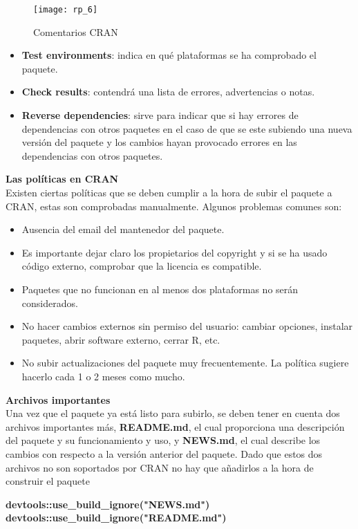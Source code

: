 \begin{figure}[H]
    \centering
    \texttt{[image: rp\_6]}
    \caption{Comentarios CRAN}
    \label{fig:comentarios}
\end{figure} 
\begin{itemize}

    \item \textbf{Test environments}: indica en qu\'e plataformas se ha comprobado el paquete.
    \item \textbf{Check results}: contendr\'a una lista de errores, advertencias o notas.
    \item \textbf{Reverse dependencies}: sirve para indicar que si hay errores de dependencias con
otros paquetes en el caso de que se este  subiendo una nueva versi\'on del paquete y los cambios hayan provocado errores en las dependencias con otros paquetes.
\end{itemize}

\textbf{Las pol\'iticas en CRAN}\\
Existen ciertas pol\'iticas que se deben cumplir a la hora de subir el paquete a CRAN, estas son comprobadas manualmente. Algunos problemas comunes son:
\begin{itemize}
    \item Ausencia del email del mantenedor del paquete. 
    \item Es importante dejar claro los propietarios del copyright y si se ha usado c\'odigo externo, comprobar que la licencia es compatible.
    \item Paquetes que no funcionan en al menos dos plataformas no ser\'an considerados.
    \item No hacer cambios externos sin permiso del usuario: cambiar opciones, instalar paquetes, abrir software externo, cerrar R, etc.
    \item No subir actualizaciones del paquete muy frecuentemente. La pol\'itica sugiere hacerlo cada 1 o 2 meses como mucho.
\end{itemize}

\textbf{Archivos importantes}\\
Una vez que el paquete ya est\'a listo para subirlo, se deben  tener en cuenta dos archivos importantes m\'as,\textbf{ README.md}, el cual proporciona una descripci\'on del paquete y su
funcionamiento y uso, y \textbf{NEWS.md}, el cual describe los cambios con respecto a la versi\'on anterior del paquete. Dado que estos dos archivos no son soportados por CRAN no
hay que a\~nadirlos a la hora de construir el paquete
\begin{center}
    \textbf{devtools::use\_build\_ignore("NEWS.md")
    devtools::use\_build\_ignore("README.md")}
\end{center}


